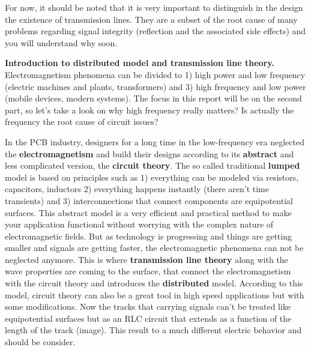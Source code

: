 \documentclass[final]{cubedoc}
\begin{document}
	
	For now, it should be noted that it is very important to distinguish in the design the existence of transmission lines. They are a subset of the root cause of many problems regarding signal integrity (reflection and the associated side effects) and you will understand why soon.
	
	\textbf{Introduction to distributed model and transmission line theory. }
	Electromagnetism phenomena can be divided to 1) high power and low frequency (electric machines and plants, transformers) and 3) high frequency and low power (mobile devices, modern systems). The focus in this report will be on the second part, so let's take a look on why high frequency really matters? Is actually the frequency the root cause of circuit issues?
	
	In the PCB industry, designers for a long time in the low-frequency era neglected the \textbf{electromagnetism} and build their designs according to its \textbf{abstract} and less complicated version, the \textbf{circuit theory}. The so called traditional \textbf{lumped} model is based on principles such as 1) everything can be modeled via resistors, capacitors, inductors 2) everything happens instantly (there aren't time transients) and 3) interconnections that connect components are equipotential surfaces. This abstract model is a very efficient and practical method to make your application functional without worrying with the complex nature of electromagnetic fields. But as technology is progressing and things are getting smaller and signals are getting faster, the electromagnetic phenomena can not be neglected anymore. This is where \textbf{transmission line theory} along with the wave properties are coming to the surface, that connect the electromagnetism with the circuit theory and introduces the \textbf{distributed} model. According to this model, circuit theory can also be a great tool in high speed applications but with some modifications. Now the tracks that carrying signals can't be treated like equipotential surfaces but as an RLC circuit that extends as a function of the length of the track (image). This result to a much different electric behavior and should be consider. 
	
\end{document}
